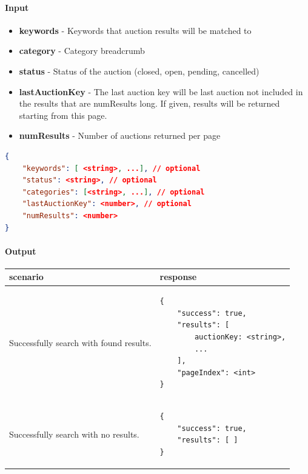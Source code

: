 \documentclass[12pt,a4paper]{article}
\begin{document}
\paragraph{Input} 

\begin{itemize}
    \item \textbf{keywords} - Keywords that auction results will be matched to
    \item \textbf{category} - Category breadcrumb
    \item \textbf{status} - Status of the auction (closed, open, pending, cancelled)
    \item \textbf{lastAuctionKey} - The last auction key will be last auction
        not included in the results that are numResults long. If given, results
        will be returned starting from this page.
    \item \textbf{numResults} - Number of auctions returned per page
\end{itemize}

\begin{lstlisting}[language=json,numbers=none]
{
    "keywords": [ <string>, ...], // optional
    "status": <string>, // optional
    "categories": [<string>, ...], // optional
    "lastAuctionKey": <number>, // optional
    "numResults": <number>
}
\end{lstlisting}

\paragraph{Output}
\begin{center}
    \begin{tabular}{| p{7cm} | l |}
        \hline
        \textbf{scenario} & \textbf{response} \\
        \hline
        Successfully search with found results. &
        \begin{lstlisting}[language=tablejson,firstnumber=1]
{
    "success": true,
    "results": [ 
        auctionKey: <string>,
        ...
    ],
    "pageIndex": <int>
}
        \end{lstlisting} \\ 
        \hline
 \hline
        Successfully search with no results. &
        \begin{lstlisting}[language=tablejson,firstnumber=1]
{
    "success": true,
    "results": [ ]
}
         \end{lstlisting} \\ 
         \hline
    \end{tabular}
\end{center}
\end{document}
